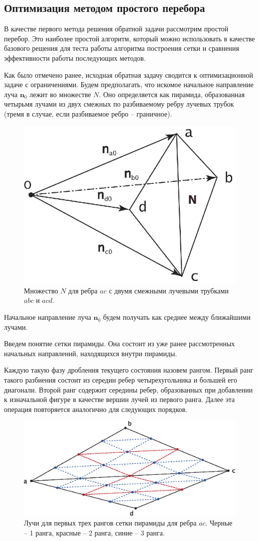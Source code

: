 \documentclass[12pt, cleqn, a4paper]{article}
\newcommand{\bfv}[1]{\mathbf{#1}}
\begin{document}
\subsection{Оптимизация методом простого перебора}
В качестве первого метода решения обратной задачи рассмотрим простой перебор. Это наиболее простой алгоритм, который можно использовать в качестве базового решения для теста работы алгоритма построения сетки и сравнения эффективности работы последующих методов.

Как было отмечено ранее, исходная обратная задачу сводится к оптимизационной задаче с ограничениями. Будем предполагать, что искомое начальное направление луча $\bfv{n}_0$ лежит во множестве $N$. Оно определяется как пирамида, образованная четырьмя лучами из двух смежных по разбиваемому ребру лучевых трубок (тремя в случае, если разбиваемое ребро -- граничное).
\begin{figure}[h!]
    \centering
    \includegraphics[width=0.5\linewidth]{set.eps}
    \caption{Множество $N$ для ребра $ac$ с двумя смежными лучевыми трубками $abc$ и $acd$.}
\end{figure}

Начальное направление луча $\bfv{n}_0$ будем получать как среднее между ближайшими лучами. 

Введем понятие сетки пирамиды. Она состоит из уже ранее рассмотренных начальных направлений, находящихся внутри пирамиды. 

Каждую такую фазу дробления текущего состояния назовем рангом. Первый ранг такого разбиения состоит из середин ребер четырехугольника и большей его диагонали. Второй ранг содержит середины ребер, образованных при добавлении к изначальной фигуре в качестве вершин лучей из первого ранга. Далее эта операция повторяется аналогично для следующих порядков.

\begin{figure}[h!]
    \centering
    \includegraphics[width=0.9\linewidth]{rank.eps}
    \caption{Лучи для первых трех рангов сетки пирамиды для ребра $ac$. Черные -- 1 ранга, красные -- 2 ранга, синие -- 3 ранга.}
\end{figure}
\end{document}
